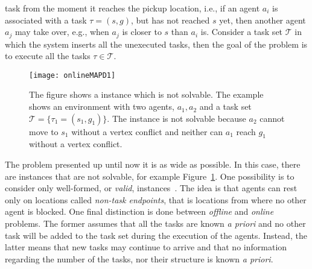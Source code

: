 task from the moment it reaches the pickup location, i.e., if an agent $a_i$ is
associated with a task $\tau=(s, g)$, but has not reached $s$ yet, then another
agent $a_j$ may take over, e.g., when $a_j$ is closer to $s$ than $a_i$ is.
Consider a task set $\mathcal{T}$ in which the system inserts all the 
unexecuted tasks, then the goal of the problem is to execute all the tasks 
$\tau\in\mathcal{T}$.
\begin{figure}[tpb]
  \centering
  \texttt{[image: onlineMAPD1]}
  \caption{The figure shows a  instance which is not solvable. The
  example shows an environment with two agents, $a_1, a_2$ and a task set
  $\mathcal{T}=\{\tau_1=(s_1,g_1)\}$. The instance is not solvable because 
  $a_2$ cannot move to $s_1$ without a vertex conflict and neither can $a_1$ 
  reach $g_1$ without a vertex conflict. }
  \label{fig:onlineMAPD1}
\end{figure}
\newline
The problem presented up until now it is as wide as possible. In this case,
there are instances that are not solvable, for example
Figure~\ref{fig:onlineMAPD1}. One possibility is to consider only well-formed,
or \textit{valid},  instances~\cite{wellFormedMAPD}. The idea is 
that agents can rest only on locations called \textit{non-task endpoints}, that 
is locations from where no other agent is blocked. \newline
One final distinction is done between \textit{offline} and \textit{online}
 problems. The former assumes that all the tasks are known \textit{a 
priori} and no other task will be added to the task set during the execution of
the agents. Instead, the latter means that new tasks may continue to arrive and
that no information regarding the number of the tasks, nor their structure is
known \textit{a priori}. 
%
